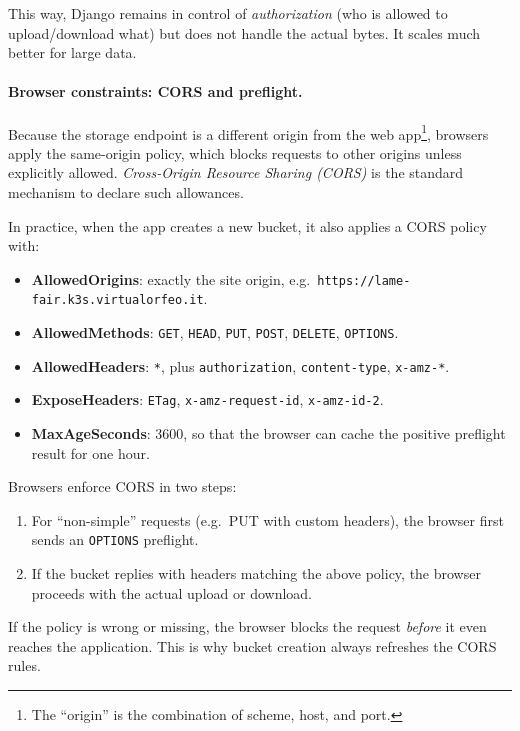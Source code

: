 This way, Django remains in control of \emph{authorization} (who is allowed to upload/download what) 
but does not handle the actual bytes.  
It scales much better for large data.

\paragraph{Browser constraints: CORS and preflight.}
Because the storage endpoint is a different origin from the web app\footnote{The “origin” is the combination of scheme, host, and port.}, 
browsers apply the same-origin policy, which blocks requests to other origins unless explicitly allowed.  
\emph{Cross-Origin Resource Sharing (CORS)} is the standard mechanism to declare such allowances.  

In practice, when the app creates a new bucket, it also applies a CORS policy with:  
\begin{itemize}
	\item \textbf{AllowedOrigins}: exactly the site origin, e.g.\ \texttt{https://lame-fair.k3s.virtualorfeo.it}.  
	\item \textbf{AllowedMethods}: \texttt{GET}, \texttt{HEAD}, \texttt{PUT}, \texttt{POST}, \texttt{DELETE}, \texttt{OPTIONS}.  
	\item \textbf{AllowedHeaders}: \texttt{*}, plus \texttt{authorization}, \texttt{content-type}, \texttt{x-amz-*}.  
	\item \textbf{ExposeHeaders}: \texttt{ETag}, \texttt{x-amz-request-id}, \texttt{x-amz-id-2}.  
	\item \textbf{MaxAgeSeconds}: 3600, so that the browser can cache the positive preflight result for one hour.  
\end{itemize}

Browsers enforce CORS in two steps:  
\begin{enumerate}
	\item For “non-simple” requests (e.g.\ PUT with custom headers), the browser first sends an \texttt{OPTIONS} preflight.  
	\item If the bucket replies with headers matching the above policy, the browser proceeds with the actual upload or download.  
\end{enumerate}

If the policy is wrong or missing, the browser blocks the request \emph{before} it even reaches the application.  
This is why bucket creation always refreshes the CORS rules.

